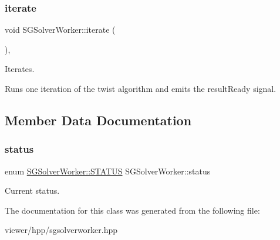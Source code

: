 \subsubsection{\texorpdfstring{iterate}{iterate}}
{\footnotesize\ttfamily void S\+G\+Solver\+Worker\+::iterate (\begin{DoxyParamCaption}{ }\end{DoxyParamCaption})\hspace{0.3cm}{\ttfamily [inline]}, {\ttfamily [slot]}}



Iterates. 

Runs one iteration of the twist algorithm and emits the result\+Ready signal. 

\subsection{Member Data Documentation}
\mbox{\label{classSGSolverWorker_a39528ca33a08b55076fa86e048261e1a}} 
\subsubsection{\texorpdfstring{status}{status}}
{\footnotesize\ttfamily enum \hyperlink{classSGSolverWorker_abf12cd2fb0c6957ef6d5be6248c60abf}{S\+G\+Solver\+Worker\+::\+S\+T\+A\+T\+US}  S\+G\+Solver\+Worker\+::status}

Current status. 

The documentation for this class was generated from the following file\+:\begin{DoxyCompactItemize}
\item 
viewer/hpp/sgsolverworker.\+hpp\end{DoxyCompactItemize}
